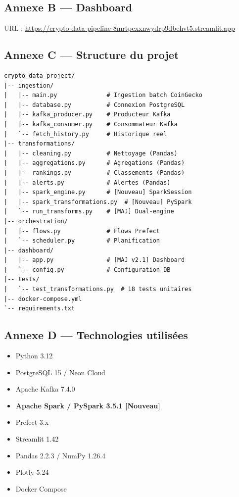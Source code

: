 \documentclass[12pt,a4paper]{article}
\begin{document}
\subsection*{Annexe B — Dashboard}
URL : \url{https://crypto-data-pipeline-8mrtpexxnwydrp9dbehvt5.streamlit.app}

\subsection*{Annexe C — Structure du projet}
\begin{lstlisting}
crypto_data_project/
|-- ingestion/
|   |-- main.py              # Ingestion batch CoinGecko
|   |-- database.py          # Connexion PostgreSQL
|   |-- kafka_producer.py    # Producteur Kafka
|   |-- kafka_consumer.py    # Consommateur Kafka
|   `-- fetch_history.py     # Historique reel
|-- transformations/
|   |-- cleaning.py          # Nettoyage (Pandas)
|   |-- aggregations.py      # Agregations (Pandas)
|   |-- rankings.py          # Classements (Pandas)
|   |-- alerts.py            # Alertes (Pandas)
|   |-- spark_engine.py      # [Nouveau] SparkSession
|   |-- spark_transformations.py  # [Nouveau] PySpark
|   `-- run_transforms.py    # [MAJ] Dual-engine
|-- orchestration/
|   |-- flows.py             # Flows Prefect
|   `-- scheduler.py         # Planification
|-- dashboard/
|   |-- app.py               # [MAJ v2.1] Dashboard
|   `-- config.py            # Configuration DB
|-- tests/
|   `-- test_transformations.py  # 18 tests unitaires
|-- docker-compose.yml
`-- requirements.txt
\end{lstlisting}

\subsection*{Annexe D — Technologies utilisées}
\begin{itemize}[noitemsep]
    \item Python 3.12
    \item PostgreSQL 15 / Neon Cloud
    \item Apache Kafka 7.4.0
    \item \textbf{Apache Spark / PySpark 3.5.1 [Nouveau]}
    \item Prefect 3.x
    \item Streamlit 1.42
    \item Pandas 2.2.3 / NumPy 1.26.4
    \item Plotly 5.24
    \item Docker Compose
\end{itemize}
\end{document}
